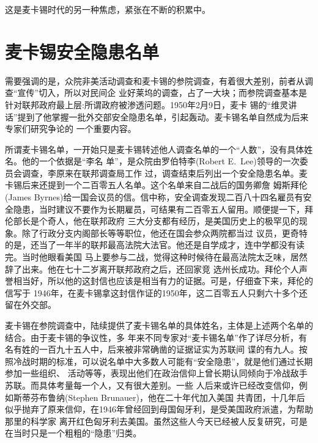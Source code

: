 \documentclass[10pt]{article}
\begin{document}
{这是麦卡锡时代的另一种焦虑，紧张在不断的积累中。


\pagebreak
\section{麦卡锡安全隐患名单}

需要强调的是，众院非美活动调查和麦卡锡的参院调查，有着很大差别，前者从调查``宣传''切入，所以对民间企
业好莱坞的调查，占了一大块；而参院调查基本是针对联邦政府最上层:所谓政府被渗透问题。1950年2月9日，麦卡
锡的``维灵讲话''提到了他掌握一批外交部安全隐患名单，引起轰动。麦卡锡名单自然成为后来专家们研究争论的
一个重要内容。

所谓麦卡锡名单，一开始只是麦卡锡转述他人调查名单的一个``人数''，没有具体姓名。他的一个依据是``李名
单''，是众院由罗伯特\textperiodcentered 李(Robert E.~Lee)领导的一次委员会调查，李原来在联邦调查局工作
过，调查结束后列出一个安全隐患名单。麦卡锡后来还提到一个二百零五人名单。这个名单来自二战后的国务卿詹
姆斯\textperiodcentered 拜伦(James Byrnes)给一国会议员的信。信中称，安全调查发现二百八十四名雇员有安
全隐患，当时建议不要作为长期雇员，可结果有二百零五人留用。顺便提一下，拜伦部长是个奇人，他在联邦政府
三大分支都有经历，是美国历史上的极罕见的现象。除了行政分支内阁部长等等职位，他还在国会参众两院都当过
议员，更奇特的是，还当了一年半的联邦最高法院大法官。他还是自学成才，连中学都没有读完。当时他眼看美国
马上要参与二战，觉得这种时候待在最高法院太乏味，居然辞了出来。他在七十二岁离开联邦政府之后，还回家竞
选州长成功。拜伦个人声誉相当好，所以他的这封信也应该是相当有力的证据。可是，仔细查下来，拜伦的信写于
1946年，在麦卡锡拿这封信作证的1950年，这二百零五人只剩六十多个还留在外交部。

麦卡锡在参院调查中，陆续提供了麦卡锡名单的具体姓名，主体是上述两个名单的结合。由于麦卡锡的争议性，多
年来不同专家对``麦卡锡名单''作了详尽分析，有名有姓的一百九十五人中，后来被非常确凿的证据证实为苏联间
谍的有九人。按照冷战时期的标准，可以说名单中大多数人可能有``安全隐患''，就是他们通过长期参加一些组织、
活动等等，表现出他们在政治信仰上曾长期认同倾向于冷战敌手苏联。而具体考量每一个人，又有很大差别。一些
人后来或许已经改变信仰，例如斯蒂芬\textperiodcentered 布鲁纳(Stephen Brunauer)，他在二十年代加入美国
共青团，十几年后似乎抛弃了原来信仰，在1946年曾经回到母国匈牙利，是受美国政府派遣，为帮助那里的科学家
离开红色匈牙利去美国。虽然这些人今天已经被人反复研究，可是在当时只是一个粗粗的``隐患''归类。

}
\end{document}
